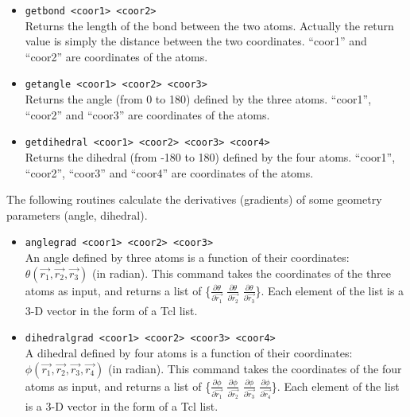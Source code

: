 \begin{itemize}

\item
{\tt getbond <coor1> <coor2>} \\
Returns the length of the bond between the two atoms. Actually
the return value is simply the distance between the two
coordinates. ``coor1'' and ``coor2'' are coordinates of the atoms.

\item
{\tt getangle <coor1> <coor2> <coor3>} \\
Returns the angle (from 0 to 180) defined by the
three atoms. ``coor1'', ``coor2'' and ``coor3'' are coordinates of
the atoms.

\item
{\tt getdihedral <coor1> <coor2> <coor3> <coor4>} \\
Returns the dihedral (from -180 to 180) defined by the
four atoms. ``coor1'', ``coor2'', ``coor3'' and ``coor4'' are
coordinates of the atoms.

\end{itemize}

The following routines calculate the derivatives (gradients) of
some geometry parameters (angle, dihedral).

\begin{itemize}

\item
{\tt anglegrad <coor1> <coor2> <coor3>} \\
An angle defined by three atoms is a function of their
coordinates:
$\theta\left(\vec{r_1},\vec{r_2},\vec{r_3}\right)$ (in radian).
This command takes the coordinates of the three atoms as input,
and returns a list of \{$\frac{\partial\theta}{\partial\vec{r_1}}$
$\frac{\partial\theta}{\partial\vec{r_2}}$
$\frac{\partial\theta}{\partial\vec{r_3}}$\}. Each element of the
list is a 3-D vector in the form of a Tcl list.

\item
{\tt dihedralgrad <coor1> <coor2> <coor3> <coor4>} \\
A dihedral defined by four atoms is a function of their
coordinates:
$\phi\left(\vec{r_1},\vec{r_2},\vec{r_3},\vec{r_4}\right)$ (in
radian). This command takes the coordinates of the four atoms as
input, and returns a list of
\{$\frac{\partial\phi}{\partial\vec{r_1}}$
$\frac{\partial\phi}{\partial\vec{r_2}}$
$\frac{\partial\phi}{\partial\vec{r_3}}$
$\frac{\partial\phi}{\partial\vec{r_4}}$\}. Each element of the
list is a 3-D vector in the form of a Tcl list.

\end{itemize}

